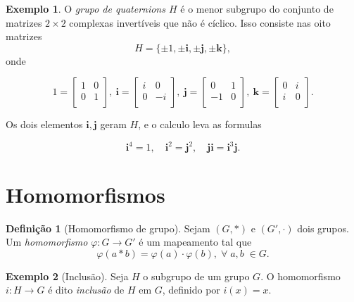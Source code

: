\documentclass[a4paper,12pt]{report}
\theoremstyle{plain}
\theoremstyle{definition}
\newtheorem{definicao}{Definição}[section]
\newtheorem{exemplo}{Exemplo}[section]
\begin{document}
\begin{exemplo}
	O \emph{grupo de quaternions \(H\)} é o menor subgrupo
	do conjunto de matrizes \(2\times 2\) complexas invertíveis que não é
	cíclico. Isso consiste nas oito matrizes
	\[H = \{\pm 1, \pm \mathbf{i}, \pm \mathbf{j}, \pm \mathbf{k}\},\] onde
	
	\[
	1=
	\begin{bmatrix}
		1 & 0 \\
		0 & 1 \\
	\end{bmatrix},
	\ \mathbf{i}=
	\begin{bmatrix}
		i & 0 \\
		0 & -i \\
	\end{bmatrix},
	\ \mathbf{j}=
	\begin{bmatrix}
		0 & 1 \\
		-1 & 0 \\
	\end{bmatrix},
	\ \mathbf{k}=
	\begin{bmatrix}
		0 & i \\
		i & 0 \\
	\end{bmatrix}.
	\]
	
	Os dois elementos \(\mathbf{i}, \mathbf{j}\) geram \(H\), e o calculo
	leva as formulas
	
	\[\mathbf{i}^4 = 1, \quad \mathbf{i}^2 = \mathbf{j}^2, \quad \mathbf{j}\mathbf{i} = \mathbf{i}^3\mathbf{j}.\]
\end{exemplo}

\section{Homomorfismos}

\begin{definicao}[Homomorfismo de grupo]
	Sejam \((G,*)\) e \((G',\cdot)\) dois grupos. Um \emph{homomorfismo} \(\varphi: G\longrightarrow G'\) é um mapeamento tal que
	\begin{equation}\tag{propriedade de homomorfismo}
		\varphi(a*b) = \varphi(a)\cdot\varphi(b), \; \forall \; a,b\; \in G.
	\end{equation}
\end{definicao}

\begin{exemplo}[Inclusão]
	Seja \(H\) o subgrupo de um grupo \(G\). O homomorfismo \(i: H \longrightarrow G\) é dito \emph{inclusão} de \(H\) em \(G\), definido por \(i(x) = x\).
\end{exemplo}
\end{document}
